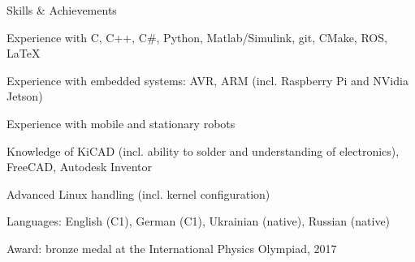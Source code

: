 \documentclass[12pt]{article} %
\begin{document}
\begin{ItemizeSection}{Skills \& Achievements}
    \item Experience with C, C++, C\#, Python, Matlab/Simulink, git, CMake, ROS, \LaTeX

    \item Experience with embedded systems: AVR, ARM (incl. Raspberry Pi and NVidia Jetson)

    \item Experience with mobile and stationary robots

    \item Knowledge of KiCAD (incl. ability to solder and understanding of electronics), FreeCAD, Autodesk Inventor

    \item Advanced Linux handling (incl. kernel configuration)

    \item Languages: English (C1), German (C1), Ukrainian (native), Russian (native)

    \item Award: bronze medal at the International Physics Olympiad, 2017
\end{ItemizeSection}


\end{document}
